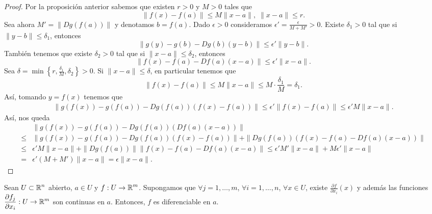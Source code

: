 \begin{proof}
Por la proposición anterior sabemos que existen $\displaystyle r > 0 $ y $\displaystyle M > 0 $ tales que 
\[\|f\left(x\right)-f\left(a\right)\| \leq M \|x-a\|, \; \|x-a\| \leq r .\]
Sea ahora $\displaystyle M' = \|Dg\left(f\left(a\right)\right)\| $ y denotamos $\displaystyle b = f\left(a\right) $. Dado $\displaystyle \epsilon > 0 $ consideramos $\displaystyle \epsilon ' = \frac{\epsilon }{M + M'} > 0 $. Existe $\displaystyle \delta _{1} > 0 $ tal que si $\displaystyle \|y - b\| \leq \delta _{1} $, entonces 
\[\|g\left(y\right)-g\left(b\right)-Dg\left(b\right)\left(y-b\right)\| \leq \epsilon '\|y - b\| .\]
También tenemos que existe $\displaystyle \delta _{2} > 0 $ tal que si $\displaystyle \|x-a\| \leq \delta_{2} $, entonces
\[\|f\left(x\right)-f\left(a\right)-Df\left(a\right)\left(x-a\right)\| \leq \epsilon ' \|x-a\| .\]
Sea $\displaystyle \delta = \min \left\{ r,\frac{\delta _{1}}{M}, \delta _{2}\right\} > 0 $. Si $\displaystyle \|x-a\| \leq \delta  $, en particular tenemos que
\[\|f\left(x\right)-f\left(a\right)\| \leq M \|x-a\| \leq M \cdot \frac{\delta _{1}}{M} = \delta _{1} .\]
Así, tomando $\displaystyle y = f\left(x\right) $ tenemos que
\[
\begin{split}
 \|g\left(f\left(x\right)\right)-g\left(f\left(a\right)\right) - Dg\left(f\left(a\right)\right)\left(f\left(x\right)-f\left(a\right)\right) \| \leq \epsilon ' \|f\left(x\right)-f\left(a\right)\| \leq \epsilon ' M \|x-a\|.
\end{split}
\]
Así, nos queda 
\[
\begin{split}
& \|g\left(f\left(x\right)\right)-g\left(f\left(a\right)\right) -Dg\left(f\left(a\right)\right)\left(Df\left(a\right)\left(x-a\right)\right)\| \\
\leq & \|g\left(f\left(x\right)\right)-g\left(f\left(a\right)\right) - Dg\left(f\left(a\right)\right)\left(f\left(x\right)-f\left(a\right)\right) \| + \|Dg\left(f\left(a\right)\right) \left(f\left(x\right)-f\left(a\right)-Df\left(a\right)\left(x-a\right)\right)\| \\
\leq & \epsilon ' M \|x-a\| + \|Dg\left(f\left(a\right)\right)\| \|f\left(x\right)-f\left(a\right) - Df\left(a\right)\left(x-a\right)\| \leq \epsilon ' M' \|x-a\| + M\epsilon ' \|x-a\|\\
= & \epsilon'\left(M + M'\right)\|x-a\| = \epsilon \|x-a\|.
\end{split}
\]
\end{proof}
\begin{theorem}
Sean $\displaystyle U \subset \mathbb{R}^{n} $ abierto, $\displaystyle a \in U $ y $\displaystyle f : U \to \mathbb{R}^{m} $. Supongamos que $\displaystyle \forall j = 1, \ldots, m $, $\displaystyle \forall i = 1, \ldots, n $, $\displaystyle \forall x \in U $, existe $\displaystyle \frac{\partial f}{\partial x_{i}}\left(x\right) $ y además las funciones $\displaystyle \frac{\partial f_{j}}{\partial x_{i}} : U \to \mathbb{R}^{m} $ son continuas en $\displaystyle a $. Entonces, $\displaystyle f $ es diferenciable en $\displaystyle a $.
\end{theorem}
